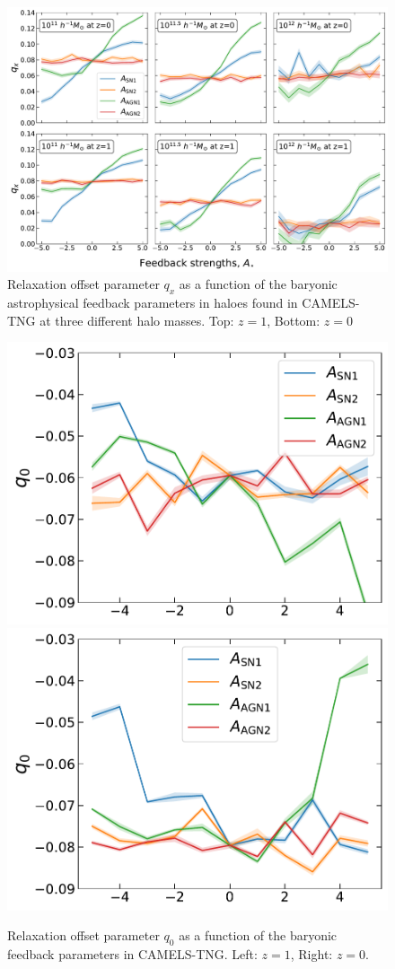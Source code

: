 \begin{figure}[htbp]
\centering
\includegraphics[width=\linewidth]{plots/CAMELS_I_qx0.pdf}
\caption{Relaxation offset parameter $q_x$ as a function of the baryonic astrophysical feedback parameters in haloes found in CAMELS-TNG at three different halo masses. Top: $z=1$, Bottom: $z=0$}
\label{fig:camels-qx0}
\end{figure}

\begin{figure}[htbp]
\centering
\includegraphics[width=0.49\linewidth]{plots/CAMELS_I_q0_sn18.pdf}
\includegraphics[width=0.49\linewidth]{plots/CAMELS_I_q0_sn33.pdf}
\caption{Relaxation offset parameter $q_0$ as a function of the baryonic feedback parameters in CAMELS-TNG. Left: $z=1$, Right: $z=0$.}
\label{fig:camels-q0q1}
\end{figure}

